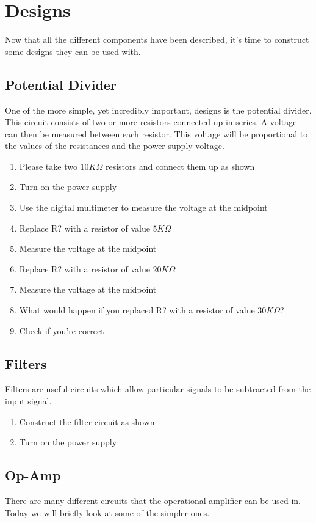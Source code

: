 \section{Designs}
Now that all the different components have been described, it's time to construct some designs they can be used with.

\subsection{Potential Divider}
One of the more simple, yet incredibly important, designs is the potential divider.
This circuit consists of two or more resistors connected up in series.
A voltage can then be measured between each resistor.
This voltage will be proportional to the values of the resistances and the power supply voltage.

\begin{enumerate}
\item Please take two $10K\Omega$ resistors and connect them up as shown
\item Turn on the power supply
\item Use the digital multimeter to measure the voltage at the midpoint
\item Replace R? with a resistor of value $5K\Omega$
\item Measure the voltage at the midpoint
\item Replace R? with a resistor of value $20K\Omega$
\item Measure the voltage at the midpoint
\item What would happen if you replaced R? with a resistor of value $30K\Omega$?
\item Check if you're correct
\end{enumerate}

\subsection{Filters}
Filters are useful circuits which allow particular signals to be subtracted from the input signal.

\begin{enumerate}
\item Construct the filter circuit as shown
\item Turn on the power supply
\end{enumerate}

\subsection{Op-Amp}
There are many different circuits that the operational amplifier can be used in.
Today we will briefly look at some of the simpler ones.

